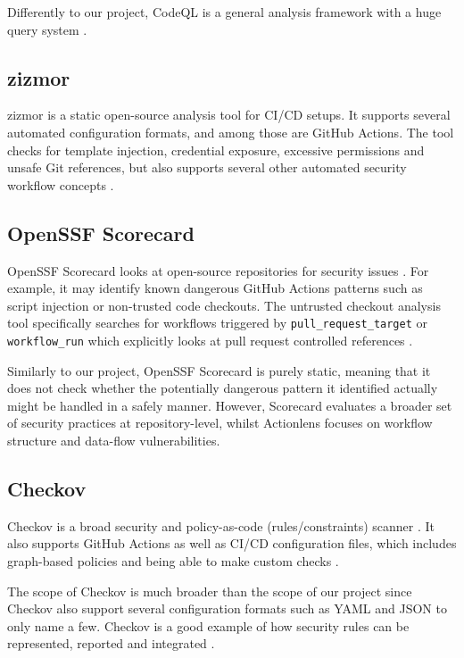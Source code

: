 \documentclass{article}
\begin{document}
Differently to our project, CodeQL is a general analysis framework with a huge query system \cite{githubcodeql}. 

\subsection{zizmor}

zizmor is a static open-source analysis tool for CI/CD setups. It supports several automated configuration formats, and among those are GitHub Actions. The tool checks for template injection, credential exposure, excessive permissions and unsafe Git references, but also supports several other automated security workflow concepts \cite{zizmor}. 

\subsection{OpenSSF Scorecard}

OpenSSF Scorecard looks at open-source repositories for security issues \cite{scorecard}. For example, it may identify known dangerous GitHub Actions patterns such as script injection or non-trusted code checkouts. The untrusted checkout analysis tool specifically searches for workflows triggered by \texttt{pull\_request\_target} or \texttt{workflow\_run} which explicitly looks at pull request controlled references \cite{scorecard}. 

Similarly to our project, OpenSSF Scorecard is purely static, meaning that it does not check whether the potentially dangerous pattern it identified actually might be handled in a safely manner. However, Scorecard evaluates a broader set of security practices at repository-level, whilst Actionlens focuses on workflow structure and data-flow vulnerabilities.

\subsection{Checkov}

Checkov is a broad security and policy-as-code (rules/constraints) scanner \cite{checkov,ibmpolicy}. It also supports GitHub Actions as well as CI/CD configuration files, which includes graph-based policies and being able to make custom checks \cite{checkov}. 

The scope of Checkov is much broader than the scope of our project since Checkov also support several configuration formats such as YAML and JSON to only name a few. Checkov is a good example of how security rules can be represented, reported and integrated \cite{checkov}. 
\end{document}
